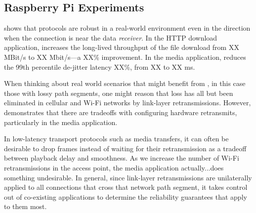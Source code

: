 \subsection{Raspberry Pi Experiments}



 shows that \Sys protocols are robust in a real-world
environment even in the direction when the \Sys connection is near the
data \textit{receiver}. In the HTTP download application, \Sys increases the
long-lived throughput of the file download from XX MBit/s to XX Mbit/s---a
XX\% improvement. In the media application, \Sys reduces the 99th percentile
de-jitter latency XX\%, from XX to XX ms.

When thinking about real world scenarios that might benefit from \Sys, in this
case those with lossy path segments, one might reason that loss has all but
been eliminated in cellular and Wi-Fi networks by link-layer retransmissions.
However,  demonstrates that there are tradeoffs with
configuring hardware retransmits, particularly in the media application.

In low-latency transport protocols such as media transfers, it can often be
desirable to drop frames instead of waiting for their retransmission as a
tradeoff between playback delay and smoothness. As we increase the number of
Wi-Fi retransmissions in the access point, the media application
actually...does something undesirable. In general, since link-layer
retransmissions are unilaterally applied to all connections that cross that
network path segment, it takes control out of co-existing applications to
determine the reliability guarantees that apply to them most.
